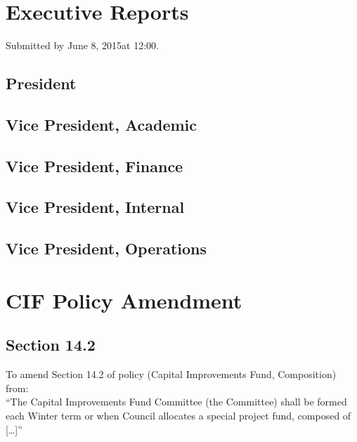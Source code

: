 \documentclass[12pt, letterpaper]{article}
\newcommand{\agendaDate}{June 8, 2015} %
\begin{document}
\newpage


\newpage

\section*{Executive Reports}
Submitted by \agendaDate at 12:00.

\subsection*{President}


\subsection*{Vice President, Academic}


\subsection*{Vice President, Finance}


\subsection*{Vice President, Internal}


\subsection*{Vice President, Operations}


\newpage
{}
\section*{CIF Policy Amendment}

\subsection*{Section 14.2}
To amend Section 14.2 of policy (Capital Improvements Fund, Composition) from:\\

“The Capital Improvements Fund Committee (the Committee) shall be formed each Winter term or when Council allocates a special project fund, composed of […]”\\
\end{document}
